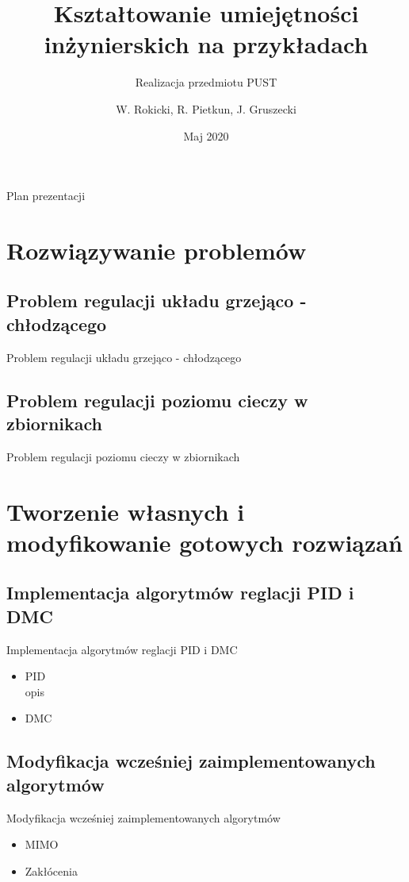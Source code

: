 \documentclass{beamer}
\title{Kształtowanie umiejętności inżynierskich na przykładach}
\subtitle{Realizacja przedmiotu PUST}
\author{W. Rokicki, R. Pietkun, J. Gruszecki}
\date{Maj 2020}
\begin{document}
\begin{frame}
\titlepage
\end{frame}

\begin{frame}[allowframebreaks]{Plan prezentacji}
\tableofcontents    
\end{frame}

\section{Rozwiązywanie problemów}

	\subsection{Problem regulacji układu grzejąco - chłodzącego}
	\begin{frame}{Problem regulacji układu grzejąco - chłodzącego}
		
	\end{frame}
	
	\subsection{Problem regulacji poziomu cieczy w zbiornikach}
	\begin{frame}{Problem regulacji poziomu cieczy w zbiornikach}
		
	\end{frame}


\section{Tworzenie własnych i modyfikowanie gotowych rozwiązań}

	\subsection{Implementacja algorytmów reglacji PID i DMC}
	\begin{frame}{Implementacja algorytmów reglacji PID i DMC}
		\begin{itemize}
			\item PID \\
			opis
			\item DMC
		\end{itemize}
	\end{frame}
	
	\subsection{Modyfikacja wcześniej zaimplementowanych algorytmów}
	\begin{frame}{Modyfikacja wcześniej zaimplementowanych algorytmów}
		\begin{itemize}
			\item MIMO 
			\item Zakłócenia
		\end{itemize}
	\end{frame}
\end{document}
